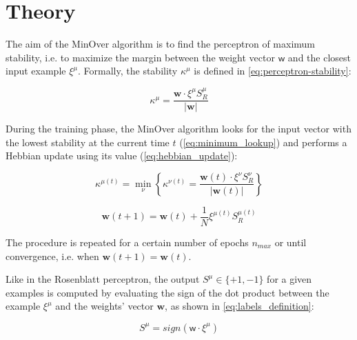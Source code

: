 \section{Theory}
\label{sec:theory}

The aim of the MinOver algorithm is to find the perceptron of maximum stability, i.e. to maximize the margin between the weight vector $\bm{\mathsf{w}}$ and the closest input example $\xi^\mu$. Formally, the stability $\kappa^\mu$ is defined in \cref{eq:perceptron-stability}:

\begin{equation}
    \kappa^\mu = \frac{\mathsf{\bm{w}} \cdotp \xi^\mu S^\mu_R}{\lvert \mathsf{\bm{w}} \rvert}
    \label{eq:perceptron-stability}
\end{equation}

During the training phase, the MinOver algorithm looks for the input vector with the lowest stability at the current time $t$ (\cref{eq:minimum_lookup}) and performs a Hebbian update using its value (\cref{eq:hebbian_update}):

\begin{equation}
    \kappa^{\mu(t)} = \min_\nu \left \{ \kappa^{\nu(t)} =  \frac{\mathsf{\bm{w}}(t) \cdotp \xi^\nu S^\nu_R}{\lvert \mathsf{\bm{w}}(t) \rvert} \right \}
    \label{eq:minimum_lookup}
\end{equation}

\begin{equation}
    \mathsf{\bm{w}}(t+1) = \mathsf{\bm{w}}(t) + \frac{1}{N} \xi^{\mu(t)} S^{\mu(t)}_R
    \label{eq:hebbian_update}
\end{equation}

The procedure is repeated for a certain number of epochs $n_{max}$ or until convergence, i.e. when $\mathsf{\bm{w}}(t+1) = \mathsf{\bm{w}}(t)$.

Like in the Rosenblatt perceptron, the output $S^\mu \in \{+1, -1\}$ for a given examples is computed by evaluating the sign of the dot product between the example $\xi^\mu$ and the weights' vector $\mathsf{\bm{w}}$, as shown in \cref{eq:labels_definition}:

\begin{equation}
    S^\mu = sign(\mathsf{w} \cdotp \xi^\mu)
    \label{eq:labels_definition}
\end{equation}
